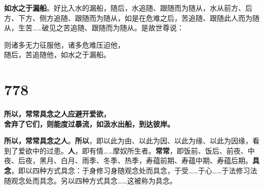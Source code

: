 \textbf{如水之于漏船}。好比入水的漏船，随后，水追随、跟随而为随从，水从前方、后方、下方、侧方追随、跟随而为随从，如是在危难之后，苦追随、跟随此人而为随从，生苦……破见之苦追随、跟随而为随从。是故世尊说：


\begin{quoting}则诸多无力征服他，诸多危难压迫他，\\随后，苦追随他，如水之于漏船。\end{quoting}


\section*{778}

\begin{quoting}\textbf{所以，常常具念之人应避开爱欲，\\舍弃了它们，则能度过暴流，如汲水出船，到达彼岸。}\end{quoting}


\textbf{所以，常常具念之人}。\textbf{所以}，即以此为由、以此为因、以此为缘、以此为因缘，看到了爱欲中的过患。\textbf{人}，即有情……摩奴所生者。\textbf{常常}，即饭前、饭后、前夜、中夜、后夜，黑月、白月、雨季、冬季、热季，寿蕴前期、寿蕴中期、寿蕴后期。\textbf{具念}，即以四种方式具念：于身修习身随观念处而具念，于受……于心……于法修习法随观念处而具念。另以四种方式具念……这被称为具念。


